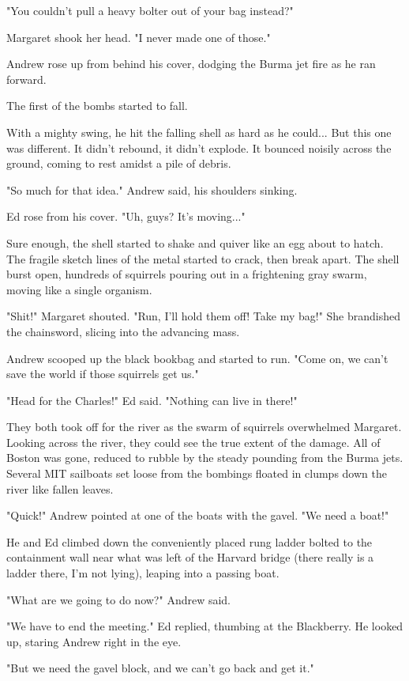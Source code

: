 \documentclass[10pt]{article}
\begin{document}
"You couldn't pull a heavy bolter out of your bag instead?"

Margaret shook her head. "I never made one of those."

Andrew rose up from behind his cover, dodging the Burma jet fire as he ran forward.

The first of the bombs started to fall.

With a mighty swing, he hit the falling shell as hard as he could... But this one was different. It didn't rebound, it didn't explode. It bounced noisily across the ground, coming to rest amidst a pile of debris.

"So much for that idea." Andrew said, his shoulders sinking.

Ed rose from his cover. "Uh, guys? It's moving..."

Sure enough, the shell started to shake and quiver like an egg about to hatch. The fragile sketch lines of the metal started to crack, then break apart. The shell burst open, hundreds of squirrels pouring out in a frightening gray swarm, moving like a single organism.

"Shit!" Margaret shouted. "Run, I'll hold them off! Take my bag!" She brandished the chainsword, slicing into the advancing mass.

Andrew scooped up the black bookbag and started to run. "Come on, we can't save the world if those squirrels get us."

"Head for the Charles!" Ed said. "Nothing can live in there!"

They both took off for the river as the swarm of squirrels overwhelmed Margaret. Looking across the river, they could see the true extent of the damage. All of Boston was gone, reduced to rubble by the steady pounding from the Burma jets. Several MIT sailboats set loose from the bombings floated in clumps down the river like fallen leaves.

"Quick!" Andrew pointed at one of the boats with the gavel. "We need a boat!"

He and Ed climbed down the conveniently placed rung ladder bolted to the containment wall near what was left of the Harvard bridge (there really is a ladder there, I'm not lying), leaping into a passing boat.

"What are we going to do now?" Andrew said.

"We have to end the meeting." Ed replied, thumbing at the Blackberry. He looked up, staring Andrew right in the eye.

"But we need the gavel block, and we can't go back and get it."
\end{document}
